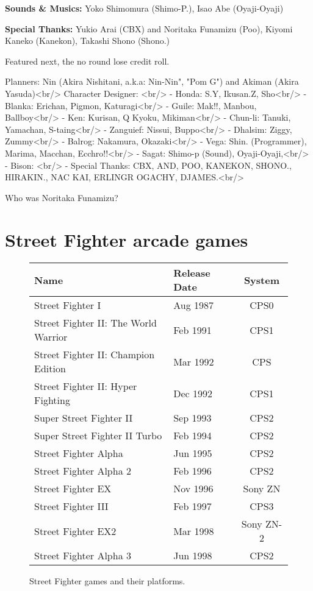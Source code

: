 \textbf{Sounds \& Musics:} Yoko Shimomura (Shimo-P.), Isao Abe (Oyaji-Oyaji)

\textbf{Special Thanks:} Yukio Arai (CBX) and Noritaka Funamizu (Poo), Kiyomi Kaneko (Kanekon), Takashi Shono (Shono.)

Featured next, the no round lose credit roll.





 Planners: Nin (Akira Nishitani, a.k.a: Nin-Nin", "Pom G") and Akiman (Akira Yasuda)<br/>
 Character Designer: <br/>
  - Honda: S.Y, Ikusan.Z, Sho<br/>
  - Blanka: Erichan, Pigmon, Katuragi<br/>
  - Guile: Mak!!, Manbou, Ballboy<br/>
  - Ken: Kurisan, Q Kyoku, Mikiman<br/>
  - Chun-li: Tanuki, Yamachan, S-taing<br/>
  - Zanguief: Nissui, Buppo<br/>
  - Dhalsim: Ziggy, Zummy<br/>
  - Balrog: Nakamura, Okazaki<br/>
  - Vega: Shin. (Programmer), Marima, Macchan, Ecchro!!<br/>
  - Sagat: Shimo-p (Sound), Oyaji-Oyaji,<br/>
  - Bison:  <br/>
  - Special Thanks: CBX, AND, POO, KANEKON, SHONO., HIRAKIN., NAC KAI, ERLINGR OGACHY, DJAMES.<br/>

  Who was Noritaka Funamizu?


\section{Street Fighter arcade games}

\begin{figure}[H]
{ \setlength{\tabcolsep}{3.0pt}
\begin{tabularx}{\textwidth}{Xlc}
  \toprule    
  \textbf{Name} & \textbf{Release Date} & \textbf{System} \\
  \toprule    
  Street Fighter I& Aug 1987& CPS0 \\
\toprule
  Street Fighter II: The World Warrior          & Feb 1991& CPS1 \\
\toprule
  Street Fighter II: Champion Edition& Mar 1992& CPS \\
\toprule
  Street Fighter II: Hyper Fighting& Dec 1992& CPS1 \\
\toprule
  Super Street Fighter II& Sep 1993& CPS2 \\
\toprule
  Super Street Fighter II Turbo& Feb 1994& CPS2 \\
\toprule
  Street Fighter Alpha& Jun 1995& CPS2 \\
\toprule
  Street Fighter Alpha 2& Feb 1996& CPS2 \\
\toprule
  Street Fighter EX& Nov 1996& Sony ZN \\
\toprule
  Street Fighter III& Feb 1997& CPS3 \\
\toprule
  Street Fighter EX2& Mar 1998& Sony ZN-2 \\
\toprule
  Street Fighter Alpha 3& Jun 1998& CPS2 \\
\toprule
\end{tabularx}%
}\caption*{Street Fighter games and their platforms.}
\end{figure}
